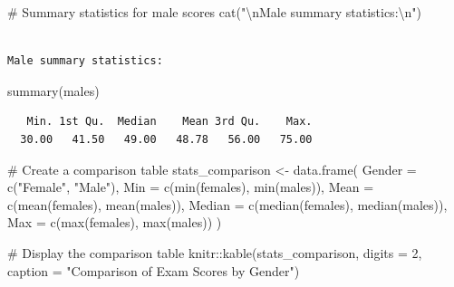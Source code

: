 \documentclass[
  letterpaper,
  DIV=11,
  numbers=noendperiod]{scrartcl}
\newenvironment{Shaded}{\begin{snugshade}}{\end{snugshade}}
\newcommand{\AttributeTok}[1]{\textcolor[rgb]{0.40,0.45,0.13}{#1}}
\newcommand{\CommentTok}[1]{\textcolor[rgb]{0.37,0.37,0.37}{#1}}
\newcommand{\DecValTok}[1]{\textcolor[rgb]{0.68,0.00,0.00}{#1}}
\newcommand{\FunctionTok}[1]{\textcolor[rgb]{0.28,0.35,0.67}{#1}}
\newcommand{\NormalTok}[1]{\textcolor[rgb]{0.00,0.23,0.31}{#1}}
\newcommand{\OtherTok}[1]{\textcolor[rgb]{0.00,0.23,0.31}{#1}}
\newcommand{\SpecialCharTok}[1]{\textcolor[rgb]{0.37,0.37,0.37}{#1}}
\newcommand{\StringTok}[1]{\textcolor[rgb]{0.13,0.47,0.30}{#1}}
\begin{document}
\begin{Shaded}
\begin{Highlighting}[]
\CommentTok{\# Summary statistics for male scores}
\FunctionTok{cat}\NormalTok{(}\StringTok{"}\SpecialCharTok{\textbackslash{}n}\StringTok{Male summary statistics:}\SpecialCharTok{\textbackslash{}n}\StringTok{"}\NormalTok{)}
\end{Highlighting}
\end{Shaded}

\begin{verbatim}

Male summary statistics:
\end{verbatim}

\begin{Shaded}
\begin{Highlighting}[]
\FunctionTok{summary}\NormalTok{(males)}
\end{Highlighting}
\end{Shaded}

\begin{verbatim}
   Min. 1st Qu.  Median    Mean 3rd Qu.    Max. 
  30.00   41.50   49.00   48.78   56.00   75.00 
\end{verbatim}

\begin{Shaded}
\begin{Highlighting}[]
\CommentTok{\# Create a comparison table}
\NormalTok{stats\_comparison }\OtherTok{\textless{}{-}} \FunctionTok{data.frame}\NormalTok{(}
  \AttributeTok{Gender =} \FunctionTok{c}\NormalTok{(}\StringTok{"Female"}\NormalTok{, }\StringTok{"Male"}\NormalTok{),}
  \AttributeTok{Min =} \FunctionTok{c}\NormalTok{(}\FunctionTok{min}\NormalTok{(females), }\FunctionTok{min}\NormalTok{(males)),}
  \AttributeTok{Mean =} \FunctionTok{c}\NormalTok{(}\FunctionTok{mean}\NormalTok{(females), }\FunctionTok{mean}\NormalTok{(males)),}
  \AttributeTok{Median =} \FunctionTok{c}\NormalTok{(}\FunctionTok{median}\NormalTok{(females), }\FunctionTok{median}\NormalTok{(males)),}
  \AttributeTok{Max =} \FunctionTok{c}\NormalTok{(}\FunctionTok{max}\NormalTok{(females), }\FunctionTok{max}\NormalTok{(males))}
\NormalTok{)}

\CommentTok{\# Display the comparison table}
\NormalTok{knitr}\SpecialCharTok{::}\FunctionTok{kable}\NormalTok{(stats\_comparison, }\AttributeTok{digits =} \DecValTok{2}\NormalTok{, }\AttributeTok{caption =} \StringTok{"Comparison of Exam Scores by Gender"}\NormalTok{)}
\end{Highlighting}
\end{Shaded}
\end{document}
